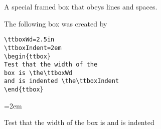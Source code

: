 \begin{ttbox}
A special framed
box that obeys lines and spaces.
\end{ttbox}

\clearpage
The following box was created by

\begin{stverbatim}
\begin{verbatim}
\ttboxWd=2.5in
\ttboxIndent=2em
\begin{ttbox}
Test that the width of the
box is \the\ttboxWd
and is indented \the\ttboxIndent
\end{ttbox}
\end{verbatim}
\end{stverbatim}

\ttboxWd=2.5in
\ttboxIndent=2em
\begin{ttbox}
Test that the width of the
box is \the\ttboxWd
and is indented \the\ttboxIndent
\end{ttbox}

\endinput

